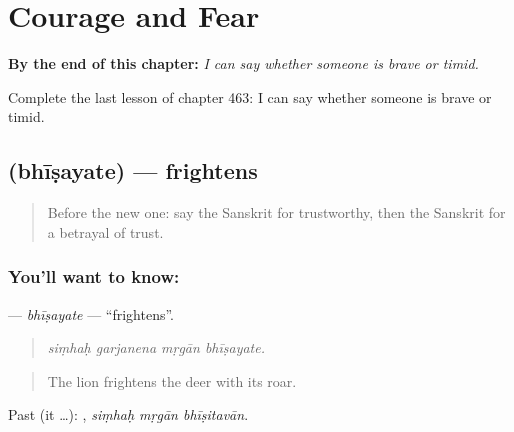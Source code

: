 
\chapter{Courage and Fear}
\label{ch:sa-courage-and-fear}

\begin{chapteropening}
\textbf{By the end of this chapter:} \emph{I can say whether someone is brave or timid.}

Complete the last lesson of chapter 463: I can say whether someone is brave or timid.
\end{chapteropening}

\section[\texorpdfstring{\sk{भीषयते} (bhīṣayate)}{भीषयते (bhīṣayate)}]{ (bhīṣayate) — frightens}

\label{lesson:SA-C463-bhisayate}



\begin{quote}
Before the new one: say the Sanskrit for trustworthy, then the Sanskrit for a betrayal of trust.
\end{quote}

\subsection*{You'll want to know: }
\textbf{} — \emph{bhīṣayate} — \textquotedblleft{}frightens\textquotedblright{}.

\begin{quote}
   
\end{quote}

\begin{quote}
\emph{siṃhaḥ garjanena mṛgān bhīṣayate.}
\end{quote}

\begin{quote}
The lion frightens the deer with its roar.
\end{quote}

Past (it …):   , \emph{siṃhaḥ mṛgān bhīṣitavān}.

